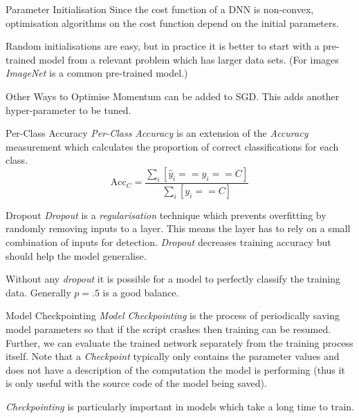 \documentclass[11pt,a4paper]{article}
\begin{document}
\begin{remark}{Parameter Initialisation}
  Since the cost function of a DNN is non-convex, optimisation algorithms on the cost function depend on the initial parameters.
  \par Random initialisations are easy, but in practice it is better to start with a pre-trained model from a relevant problem which has larger data sets. (For images \textit{ImageNet} is a common pre-trained model.)
\end{remark}

\begin{remark}{Other Ways to Optimise}
  Momentum can be added to SGD. This adds another hyper-parameter to be tuned.
\end{remark}

\begin{proposition}{Per-Class Accuracy}
  \textit{Per-Class Accuracy} is an extension of the \textit{Accuracy} measurement which calculates the proportion of correct classifications for each class.
  \[ \text{Acc}_C=\frac{\sum_i[\hat{y}_i==y_i==C]}{\sum_i[y_i==C]} \]
\end{proposition}

\begin{remark}{Dropout}
  \textit{Dropout} is a \textit{regularisation} technique which prevents overfitting by randomly removing inputs to a layer. This means the layer has to rely on a small combination of inputs for detection. \textit{Dropout} decreases training accuracy but should help the model generalise.
  \par Without any \textit{dropout} it is possible for a model to perfectly classify the training data. Generally $p=.5$ is a good balance.
\end{remark}

\begin{proposition}{Model Checkpointing}
  \textit{Model Checkpointing} is the process of periodically saving model parameters so that if the script crashes then training can be resumed. Further, we can evaluate the trained network separately from the training process itself. Note that a \textit{Checkpoint} typically only contains the parameter values and does not have a description of the computation the model is performing (thus it is only useful with the source code of the model being saved).
  \par \textit{Checkpointing} is particularly important in models which take a long time to train.
\end{proposition}
\end{document}
